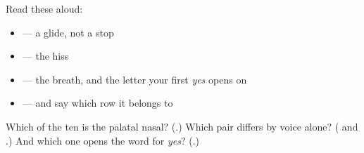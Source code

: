 Read these aloud:

\begin{itemize}
\raggedright
  \item \textbf{} — a glide, not a stop
  \item \textbf{} — the hiss
  \item \textbf{} — the breath, and the letter your first \emph{yes} opens on
  \item \textbf{} — and say which row it belongs to
\end{itemize}

\begin{tcolorbox}[breakable,colback=teal!4,colframe=teal!35!black,title={Before you move on}]
Which of the ten is the palatal nasal? (\textbf{}.) Which pair differs by voice alone? (\textbf{} and \textbf{}.) And which one opens the word for \emph{yes}? (\textbf{}.)
\end{tcolorbox}

